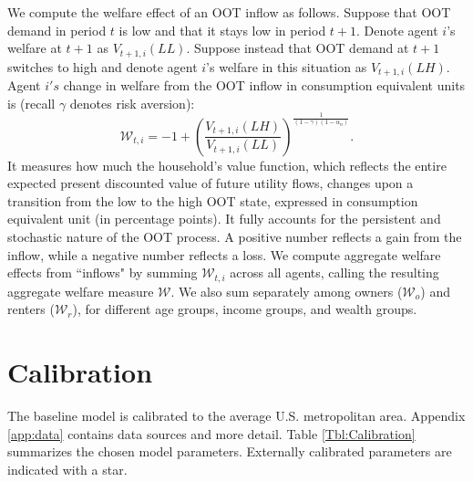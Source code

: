 \documentclass[letterpaper,12pt,dvipsnames,usenames]{article}
\theoremstyle{definition}
\begin{document}
\begin{spacing}{1.25}
We compute the welfare effect of an OOT inflow as follows. Suppose that OOT demand in period $t$ is low and that it stays low in period $t+1$. Denote agent $i$'s welfare at $t+1$ as $V_{t+1,i}(LL)$. Suppose instead that OOT demand at $t+1$ switches to high and denote agent $i$'s welfare in this situation as $V_{t+1,i}(LH)$. Agent $i's$ change in welfare from the OOT inflow in consumption equivalent units is (recall $\gamma$ denotes risk aversion):
\[\mathcal{W}_{t,i}=-1+\left(\frac{V_{t+1,i}(LH)}{V_{t+1,i}(LL)}\right)^{\frac{1}{(1-\gamma)(1-\alpha_{n})}}.\]
It measures how much the household's value function, which reflects the entire expected present discounted value of future utility flows, changes upon a transition from the low to the high OOT state, expressed in consumption equivalent unit (in percentage points). It fully accounts for the persistent and stochastic nature of the OOT process. A positive number reflects a gain from the inflow, while a negative number reflects a loss. We compute aggregate welfare effects from ``inflows" by summing $\mathcal{W}_{t,i}$ across all agents, calling the resulting aggregate welfare measure $\mathcal{W}$.  We also sum separately among owners ($\mathcal{W}_o$) and renters ($\mathcal{W}_r$), for different age groups, income groups, and wealth groups. %



\section{Calibration}

The baseline model is calibrated to the average U.S. metropolitan area. Appendix \ref{app:data} contains data sources and more detail.  Table \ref{Tbl:Calibration} summarizes the chosen model parameters. Externally calibrated parameters are indicated with a star.


\end{spacing}
\end{document}
